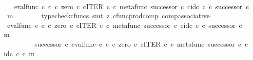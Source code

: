 \begin{isabellebody}
\ \ \ \ \isamarkupfalse%
\ \isamarkupfalse%
\ {\isachardoublequoteopen}{\isachardot}{\kern0pt}{\isachardot}{\kern0pt}{\isachardot}{\kern0pt}\ {\isacharequal}{\kern0pt}\ {\isacharparenleft}{\kern0pt}{\isacharparenleft}{\kern0pt}eval{\isacharunderscore}{\kern0pt}func\ {\isasymnat}\isactrlsub c\ {\isasymnat}\isactrlsub c\ {\isasymcirc}\isactrlsub c\ {\isasymlangle}zero\ {\isasymcirc}\isactrlsub c\ {\isasymbeta}\isactrlbsub {\isasymnat}\isactrlsub c\isactrlesub {\isacharcomma}{\kern0pt}ITER\ {\isasymnat}\isactrlsub c\ {\isasymcirc}\isactrlsub c\ {\isasymlangle}metafunc\ successor\ {\isasymcirc}\isactrlsub c\ {\isasymbeta}\isactrlbsub {\isasymnat}\isactrlsub c\isactrlesub {\isacharcomma}{\kern0pt}id\isactrlsub c\ {\isasymnat}\isactrlsub c{\isasymrangle}{\isasymrangle}{\isacharparenright}{\kern0pt}\ {\isasymcirc}\isactrlsub c\ successor{\isacharparenright}{\kern0pt}\ {\isasymcirc}\isactrlsub c\ m{\isachardoublequoteclose}\isanewline
\ \ \ \ \ \ \isamarkupfalse%
\ {\isacharparenleft}{\kern0pt}typecheck{\isacharunderscore}{\kern0pt}cfuncs{\isacharcomma}{\kern0pt}\ smt\ {\isacharparenleft}{\kern0pt}z{}{\isacharparenright}{\kern0pt}\ cfunc{\isacharunderscore}{\kern0pt}prod{\isacharunderscore}{\kern0pt}comp\ comp{\isacharunderscore}{\kern0pt}associative{}{\isacharparenright}{\kern0pt}\isanewline
\ \ \ \ \isamarkupfalse%
\ \isamarkupfalse%
\ {\isachardoublequoteopen}{\isacharparenleft}{\kern0pt}{\isacharparenleft}{\kern0pt}eval{\isacharunderscore}{\kern0pt}func\ {\isasymnat}\isactrlsub c\ {\isasymnat}\isactrlsub c\ {\isasymcirc}\isactrlsub c\ {\isasymlangle}zero\ {\isasymcirc}\isactrlsub c\ {\isasymbeta}\isactrlbsub {\isasymnat}\isactrlsub c\isactrlesub {\isacharcomma}{\kern0pt}ITER\ {\isasymnat}\isactrlsub c\ {\isasymcirc}\isactrlsub c\ {\isasymlangle}metafunc\ successor\ {\isasymcirc}\isactrlsub c\ {\isasymbeta}\isactrlbsub {\isasymnat}\isactrlsub c\isactrlesub {\isacharcomma}{\kern0pt}id\isactrlsub c\ {\isasymnat}\isactrlsub c{\isasymrangle}{\isasymrangle}{\isacharparenright}{\kern0pt}\ {\isasymcirc}\isactrlsub c\ successor{\isacharparenright}{\kern0pt}\ {\isasymcirc}\isactrlsub c\ m\ {\isacharequal}{\kern0pt}\isanewline
\ \ \ \ \ \ \ \ \ {\isacharparenleft}{\kern0pt}successor\ {\isasymcirc}\isactrlsub c\ eval{\isacharunderscore}{\kern0pt}func\ {\isasymnat}\isactrlsub c\ {\isasymnat}\isactrlsub c\ {\isasymcirc}\isactrlsub c\ {\isasymlangle}zero\ {\isasymcirc}\isactrlsub c\ {\isasymbeta}\isactrlbsub {\isasymnat}\isactrlsub c\isactrlesub {\isacharcomma}{\kern0pt}ITER\ {\isasymnat}\isactrlsub c\ {\isasymcirc}\isactrlsub c\ {\isasymlangle}metafunc\ successor\ {\isasymcirc}\isactrlsub c\ {\isasymbeta}\isactrlbsub {\isasymnat}\isactrlsub c\isactrlesub {\isacharcomma}{\kern0pt}id\isactrlsub c\ {\isasymnat}\isactrlsub c{\isasymrangle}{\isasymrangle}{\isacharparenright}{\kern0pt}\ {\isasymcirc}\isactrlsub c\ m{\isachardoublequoteclose}\isanewline

\end{isabellebody}
